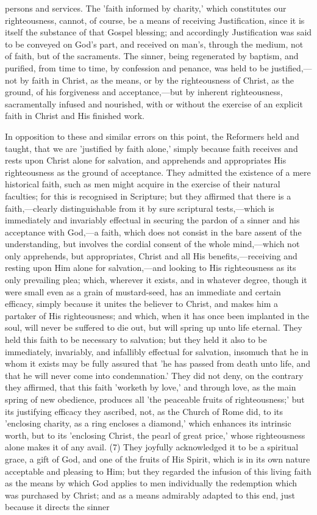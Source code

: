 \documentclass[
]{book}
\begin{document}
persons and services. The 'faith informed by charity,' which constitutes our righteousness, cannot, of course, be a means of receiving Justification, since it is itself the substance of that Gospel blessing; and accordingly Justification was said to be conveyed on God's part, and received on man's, through the medium, not of faith, but of the sacraments. The sinner, being regenerated by baptism, and purified, from time to time, by confession and penance, was held to be justified,---not by faith in Christ, as the means, or by the righteousness of Christ, as the ground, of his forgiveness and acceptance,---but by inherent righteousness, sacramentally infused and nourished, with or without the exercise of an explicit faith in Christ and His finished work.

In opposition to these and similar errors on this point, the Reformers held and taught, that we are 'justified by faith alone,' simply because faith receives and rests upon Christ alone for salvation, and apprehends and appropriates His righteousness as the ground of acceptance. They admitted the existence of a mere historical faith, such as men might acquire in the exercise of their natural faculties; for this is recognised in Scripture; but they affirmed that there is a faith,---clearly distinguishable from it by sure scriptural tests,---which is immediately and invariably effectual in securing the pardon of a sinner and his acceptance with God,---a faith, which does not consist in the bare assent of the understanding, but involves the cordial consent of the whole mind,---which not only apprehends, but appropriates, Christ and all His benefits,---receiving and resting upon Him alone for salvation,---and looking to His righteousness as its only prevailing plea; which, wherever it exists, and in whatever degree, though it were small even as a grain of mustard-seed, has an immediate and certain efficacy, simply because it unites the believer to Christ, and makes him a partaker of His righteousness; and which, when it has once been implanted in the soul, will never be suffered to die out, but will spring up unto life eternal. They held this faith to be necessary to salvation; but they held it also to be immediately, invariably, and infallibly effectual for salvation, insomuch that he in whom it exists may be fully assured that 'he has passed from death unto life, and that he will never come into condemnation.' They did not deny, on the contrary they affirmed, that this faith 'worketh by love,' and through love, as the main spring of new obedience, produces all 'the peaceable fruits of righteousness;' but its justifying efficacy they ascribed, not, as the Church of Rome did, to its 'enclosing charity, as a ring encloses a diamond,' which enhances its intrinsic worth, but to its 'enclosing Christ, the pearl of great price,' whose righteousness alone makes it of any avail. (7) They joyfully acknowledged it to be a spiritual grace, a gift of God, and one of the fruits of His Spirit, which is in its own nature acceptable and pleasing to Him; but they regarded the infusion of this living faith as the means by which God applies to men individually the redemption which was purchased by Christ; and as a means admirably adapted to this end, just because it directs the sinner 
\end{document}
